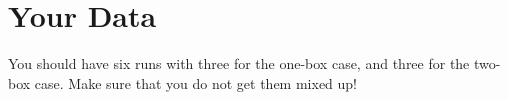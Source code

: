 \section{Your Data}
%
You should have six runs with three for the one-box case, and three for the two-box case. Make sure that you do not get them mixed up!
%
